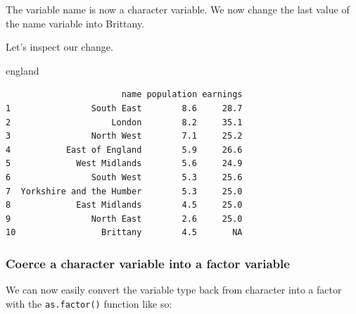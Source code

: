 \documentclass[]{article}
\newenvironment{Shaded}{\begin{snugshade}}{\end{snugshade}}
\newcommand{\KeywordTok}[1]{\textcolor[rgb]{0.13,0.29,0.53}{\textbf{#1}}}
\newcommand{\NormalTok}[1]{#1}
\newcommand{\OperatorTok}[1]{\textcolor[rgb]{0.81,0.36,0.00}{\textbf{#1}}}
\newcommand{\StringTok}[1]{\textcolor[rgb]{0.31,0.60,0.02}{#1}}
\begin{document}
The variable name is now a character variable. We now change the last value of the name variable into Brittany.

\begin{Shaded}
\end{Shaded}

Let's inspect our change.

\begin{Shaded}
\begin{Highlighting}[]
\NormalTok{england}
\end{Highlighting}
\end{Shaded}

\begin{verbatim}
                       name population earnings
1                South East        8.6     28.7
2                    London        8.2     35.1
3                North West        7.1     25.2
4           East of England        5.9     26.6
5             West Midlands        5.6     24.9
6                South West        5.3     25.6
7  Yorkshire and the Humber        5.3     25.0
8             East Midlands        4.5     25.0
9                North East        2.6     25.0
10                 Brittany        4.5       NA
\end{verbatim}

\hypertarget{coerce-a-character-variable-into-a-factor-variable}{%
\subsubsection{Coerce a character variable into a factor variable}\label{coerce-a-character-variable-into-a-factor-variable}}

We can now easily convert the variable type back from character into a factor with the \texttt{as.factor()} function like so:

\begin{Shaded}
\end{Shaded}
\end{document}
